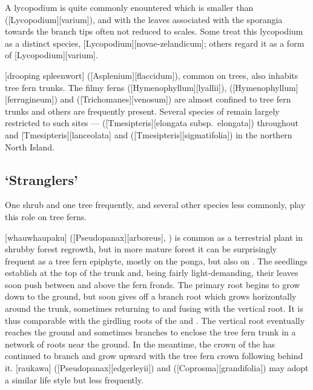 A lycopodium is quite commonly enountered which is smaller than  ([Lycopodium][varium]), and with the leaves associated with the sporangia towards the branch tips often not reduced to scales.
Some treat this lycopodium as a distinct species, [Lycopodium][novae-zelandicum]; others regard it as a form of [Lycopodium][varium].

[drooping spleenwort] ([Asplenium][flaccidum]), common on trees, also inhabits tree fern trunks.
The filmy ferns  ([Hymenophyllum][lyallii]),  ([Hymenophyllum][ferrugineum]) and  ([Trichomanes][venosum]) are almost confined to tree fern trunks and others are frequently present.
Several species of  remain largely restricted to such sites ---  ([Tmesipteris][elongata subsp.\ elongata]) throughout and [Tmesipteris][lanceolata] and  ([Tmesipteris][sigmatifolia]) in the northern North Island.

\subsection{`Stranglers'}

One shrub and one tree frequently, and several other species less commonly, play this role on tree ferns.

[whauwhaupaku] ([Pseudopanax][arboreus], ) is common as a terrestrial plant in shrubby forest regrowth, but in more mature forest it can be surprisingly frequent as a tree fern epiphyte, mostly on the ponga, but also on .
The seedlings establish at the top of the trunk and, being fairly light-demanding, their leaves soon push between and above the fern fronds.
The primary root begins to grow down to the ground, but soon gives off a branch root which grows horizontally around the trunk, sometimes returning to and fusing with the vertical root.
It is thus comparable with the girdling roots of the  and .
The vertical root eventually reaches the ground and sometimes branches to enclose the tree fern trunk in a network of roots near the ground.
In the meantime, the crown of the  has continued to branch and grow upward with the tree fern crown following behind it.
[raukawa] ([Pseudopanax][edgerleyii]) and  ([Coprosma][grandifolia]) may adopt a similar life style but less frequently.

